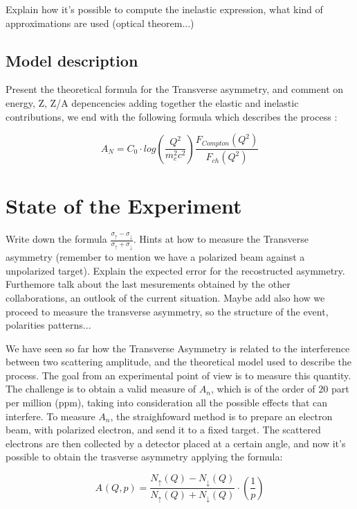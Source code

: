 Explain how it's possible to compute the inelastic expression, what kind of approximations are used (optical theorem...) 

\subsection{Model description}
Present the theoretical formula for the Transverse asymmetry, and comment on energy, Z, Z/A depencencies adding together the elastic and inelastic contributions, we end with the following formula which describes the process \cite{PhysRevLett.121.022503}:

\begin{equation}
A_{N} = C_{0} \cdot log(\dfrac{Q^{2}}{m_{e}^{2} c^{2}}) \dfrac{F_{Compton}(Q^{2})}{F_{ch}(Q^{2})}
\end{equation}

\section{State of the Experiment}

Write down the formula $\frac{\sigma_{\uparrow} - \sigma_{\downarrow}}{\sigma_{\uparrow} + \sigma_{\downarrow}}$. Hints at how to measure the Transverse asymmetry (remember to mention we have a polarized beam against a unpolarized target). Explain the expected error for the recostructed asymmetry. Furthemore talk about the last mesurements obtained by the other collaborations, an outlook of the current situation. Maybe add also how we proceed to measure the transverse asymmetry, so the structure of the event, polarities patterns...
\bigskip

We have seen so far how the Transverse Asymmetry is related to the interference between two scattering amplitude, and the theoretical model used to describe the process. The goal from an experimental point of view is to measure this quantity. The challenge is to obtain a valid measure of $A_{n}$, which is of the order of $20$ part per million (ppm), taking into consideration all the possible effects that can interfere. To measure $A_{n}$, the straighfoward method is to prepare an electron beam, with polarized electron, and send it to a fixed target. The scattered electrons are then collected by a detector placed at a certain angle, and now it's possible to obtain the trasverse asymmetry applying the formula:

\begin{equation}
A_{} (Q,p) = \dfrac{N_{\uparrow}(Q) - N_{\downarrow}(Q)}{N_{\uparrow}(Q) + N_{\downarrow}(Q)} \cdot (\frac{1}{p})   
\end{equation} 

